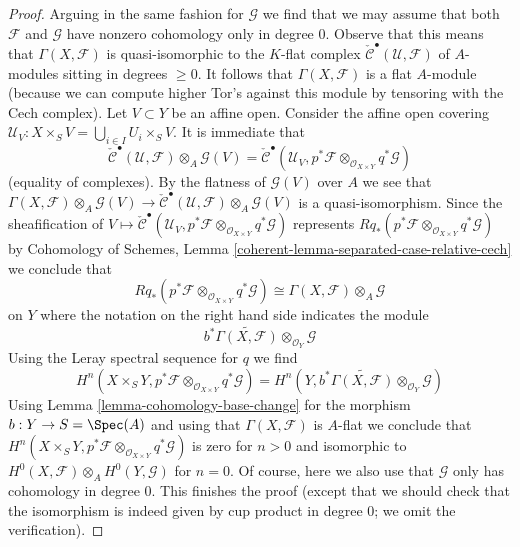 \begin{proof}
\medskip\noindent
Arguing in the same fashion for $\mathcal{G}$ we find that we
may assume that both $\mathcal{F}$ and $\mathcal{G}$
have nonzero cohomology only in degree $0$.
Observe that this means that $\Gamma(X, \mathcal{F})$
is quasi-isomorphic to the $K$-flat complex
$\check{\mathcal{C}}^\bullet(\mathcal{U}, \mathcal{F})$
of $A$-modules sitting in degrees $\geq 0$.
It follows that $\Gamma(X, \mathcal{F})$ is a flat $A$-module
(because we can compute higher Tor's against this module
by tensoring with the Cech complex).
Let $V \subset Y$ be an affine open. Consider the affine open covering
$\mathcal{U}_V : X \times_S V = \bigcup_{i \in I} U_i \times_S V$.
It is immediate that
$$
\check{\mathcal{C}}^\bullet(\mathcal{U}, \mathcal{F})
\otimes_A \mathcal{G}(V) =
\check{\mathcal{C}}^\bullet(\mathcal{U}_V,
p^*\mathcal{F} \otimes_{\mathcal{O}_{X \times Y}}
q^*\mathcal{G})
$$
(equality of complexes). By the flatness of $\mathcal{G}(V)$
over $A$ we see that
$\Gamma(X, \mathcal{F}) \otimes_A \mathcal{G}(V) \to
\check{\mathcal{C}}^\bullet(\mathcal{U}, \mathcal{F})
\otimes_A \mathcal{G}(V)$ is a quasi-isomorphism.
Since the sheafification of
$V \mapsto \check{\mathcal{C}}^\bullet(\mathcal{U}_V,
p^*\mathcal{F} \otimes_{\mathcal{O}_{X \times Y}}
q^*\mathcal{G})$ represents
$Rq_*(p^*\mathcal{F} \otimes_{\mathcal{O}_{X \times Y}} q^*\mathcal{G})$
by Cohomology of Schemes, Lemma
\ref{coherent-lemma-separated-case-relative-cech}
we conclude that
$$
Rq_*(p^*\mathcal{F} \otimes_{\mathcal{O}_{X \times Y}} q^*\mathcal{G})
\cong
\Gamma(X, \mathcal{F}) \otimes_A \mathcal{G}
$$
on $Y$ where the notation on the right hand side indicates the module
$$
b^*\widetilde{\Gamma(X, \mathcal{F})} \otimes_{\mathcal{O}_Y} \mathcal{G}
$$
Using the Leray spectral sequence for $q$ we find
$$
H^n(X \times_S Y, p^*\mathcal{F} \otimes_{\mathcal{O}_{X \times Y}}
q^*\mathcal{G}) =
H^n(Y,
b^*\widetilde{\Gamma(X, \mathcal{F})} \otimes_{\mathcal{O}_Y} \mathcal{G})
$$
Using Lemma \ref{lemma-cohomology-base-change} for the morphism
$b : Y \to S = \Spec(A)$ and using that $\Gamma(X, \mathcal{F})$
is $A$-flat we conclude that
$H^n(X \times_S Y, p^*\mathcal{F} \otimes_{\mathcal{O}_{X \times Y}}
q^*\mathcal{G})$ is zero for $n > 0$ and isomorphic to
$H^0(X, \mathcal{F}) \otimes_A H^0(Y, \mathcal{G})$ for $n = 0$.
Of course, here we also use that $\mathcal{G}$ only has
cohomology in degree $0$.
This finishes the proof (except that we should check that the
isomorphism is indeed given by cup product in degree $0$; we omit
the verification).
\end{proof}

